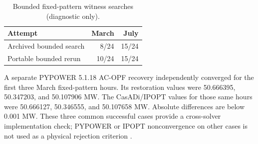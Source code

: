 \documentclass[10pt,journal,onecolumn]{IEEEtran}
\begin{document}
\begin{table}[t]
\centering
\caption{Bounded fixed-pattern witness searches (diagnostic only).}
\label{tab:supp-fixed}
\begin{tabular}{lrr}
\toprule
Attempt & March & July\\
\midrule
Archived bounded search & 8/24 & 15/24\\
Portable bounded rerun & 10/24 & 15/24\\
\bottomrule
\end{tabular}
\end{table}

A separate PYPOWER 5.1.18 AC-OPF recovery independently converged for the first three March fixed-pattern hours. Its restoration values were 50.666395, 50.347203, and 50.107906 MW. The CasADi/IPOPT values for those same hours were 50.666127, 50.346555, and 50.107658 MW. Absolute differences are below 0.001 MW. These three common successful cases provide a cross-solver implementation check; PYPOWER or IPOPT nonconvergence on other cases is not used as a physical rejection criterion \cite{Zimmerman2011}.

\FloatBarrier
\end{document}
